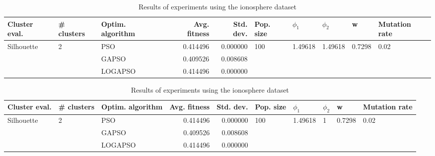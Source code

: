 \documentclass{article}
\begin{document}
\begin{table}
\centering
\caption{Results of experiments using the ionosphere dataset}
\begin{tabular}{lllrrlllll}
\toprule
              Cluster eval. &        \# clusters & Optim. algorithm &  Avg. fitness &  Std. dev. &            Pop. size &               $\phi_{1}$ &               $\phi_{2}$ &                       w &         Mutation rate \\
\midrule
\multirow{3}{*}{Silhouette} & \multirow{3}{*}{2} &              PSO &      0.414496 &   0.000000 & \multirow{3}{*}{100} & \multirow{3}{*}{1.49618} & \multirow{3}{*}{1.49618} & \multirow{3}{*}{0.7298} & \multirow{3}{*}{0.02} \\
                            &                    &            GAPSO &      0.409526 &   0.008608 &                      &                          &                          &                         &                       \\
                            &                    &          LOGAPSO &      0.414496 &   0.000000 &                      &                          &                          &                         &                       \\
\bottomrule
\end{tabular}
\end{table}
\begin{table}
\centering
\caption{Results of experiments using the ionosphere dataset}
\begin{tabular}{lllrrlllll}
\toprule
              Cluster eval. &        \# clusters & Optim. algorithm &  Avg. fitness &  Std. dev. &            Pop. size &               $\phi_{1}$ &         $\phi_{2}$ &                       w &         Mutation rate \\
\midrule
\multirow{3}{*}{Silhouette} & \multirow{3}{*}{2} &              PSO &      0.414496 &   0.000000 & \multirow{3}{*}{100} & \multirow{3}{*}{1.49618} & \multirow{3}{*}{1} & \multirow{3}{*}{0.7298} & \multirow{3}{*}{0.02} \\
                            &                    &            GAPSO &      0.409526 &   0.008608 &                      &                          &                    &                         &                       \\
                            &                    &          LOGAPSO &      0.414496 &   0.000000 &                      &                          &                    &                         &                       \\
\bottomrule
\end{tabular}
\end{table}
\end{document}
